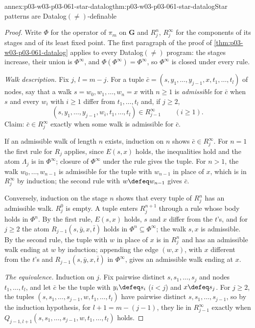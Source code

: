 \begin{annexitem}{annex:p03-w03-p03-061-star-datalog}{thm:p03-w03-p03-061-star-datalog}{Star patterns are Datalog\((\neq)\)-definable}
\begin{proof}
Write \(\Phi\) for the operator of \(\pi_m\) on \(\mathbf G\) and
\(R_j^n\), \(R_j^\infty\) for the components of its stages and of its least
fixed point. The first paragraph of the proof of
\cref{thm:p03-w03-p03-061-datalog} applies to every Datalog\((\neq)\)
program: the stages increase, their union is \(\Phi^\infty\), and
\(\Phi(\Phi^\infty)=\Phi^\infty\), so \(\Phi^\infty\) is closed under every
rule.

\emph{Walk description.} Fix \(j\), \(l=m-j\). For a tuple
\(\bar c=(s,y_1,\ldots,y_{j-1},x,t_1,\ldots,t_l)\) of nodes, say that a walk
\(s=w_0,w_1,\ldots,w_n=x\) with \(n\ge1\) is \emph{admissible} for
\(\bar c\) when \(s\) and every \(w_i\) with \(i\ge1\) differ from
\(t_1,\ldots,t_l\) and, if \(j\ge2\),
\[
 (s,y_1,\ldots,y_{j-1},w_i,t_1,\ldots,t_l)\in R_{j-1}^\infty
 \qquad(i\ge1).
\] Claim: \(\bar c\in R_j^\infty\) exactly when some walk is
admissible for \(\bar c\).

If an admissible walk of length \(n\) exists, induction on \(n\) shows
\(\bar c\in R_j^\infty\). For \(n=1\) the first rule for \(R_j\) applies,
since \(E(s,x)\) holds, the inequalities hold and the atom \(\Lambda_j\) is
in \(\Phi^\infty\); closure of \(\Phi^\infty\) under the rule gives the
tuple. For \(n>1\), the walk \(w_0,\ldots,w_{n-1}\) is admissible for the
tuple with \(w_{n-1}\) in place of \(x\), which is in \(R_j^\infty\) by
induction; the second rule with \(w\defeq w_{n-1}\) gives \(\bar c\).

Conversely, induction on the stage \(n\) shows that every tuple of \(R_j^n\)
has an admissible walk. \(R_j^0\) is empty. A tuple enters \(R_j^{n+1}\)
through a rule whose body holds in \(\Phi^n\). By the first rule, \(E(s,x)\)
holds, \(s\) and \(x\) differ from the \(t\)'s, and for \(j\ge2\) the atom
\(R_{j-1}(s,\bar y,x,\bar t)\) holds in \(\Phi^n\subseteq\Phi^\infty\); the
walk \(s,x\) is admissible. By the second rule, the tuple with \(w\) in place
of \(x\) is in \(R_j^n\) and has an admissible walk ending at \(w\) by
induction; appending the edge \((w,x)\), with \(x\) different from the
\(t\)'s and \(R_{j-1}(s,\bar y,x,\bar t)\) in \(\Phi^\infty\), gives an
admissible walk ending at \(x\).

\emph{The equivalence.} Induction on \(j\). Fix pairwise distinct
\(s,s_1,\ldots,s_j\) and nodes \(t_1,\ldots,t_l\), and let \(\bar c\) be the
tuple with \(y_i\defeq s_i\) (\(i<j\)) and \(x\defeq s_j\). For \(j\ge2\),
the tuples \((s,s_1,\ldots,s_{j-1},w,t_1,\ldots,t_l)\) have pairwise distinct
\(s,s_1,\ldots,s_{j-1}\), so by the induction hypothesis, for
\(l+1=m-(j-1)\), they lie in \(R_{j-1}^\infty\) exactly when
\(Q_{j-1,l+1}(s,s_1,\ldots,s_{j-1},w,t_1,\ldots,t_l)\) holds.


\end{proof}
\end{annexitem}
